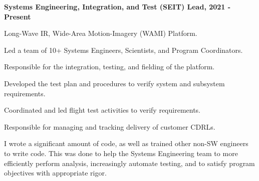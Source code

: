 \documentclass[10pt]{article}
\newenvironment{outerlist}[1][\enskip\textbullet]%
        {\begin{itemize}[#1]}{\end{itemize}%
         \vspace{-.6\baselineskip}}
\newenvironment{innerlist}[1][\enskip\textbullet]%
        {\begin{compactitem}[#1]}{\end{compactitem}}
\begin{document}
     \begin{outerlist}
         \item \textbf{Systems Engineering, Integration, and Test (SEIT) Lead, 2021 - Present}\\
         \begin{innerlist}
            \item Long-Wave IR, Wide-Area Motion-Imagery (WAMI) Platform.
            \item Led a team of 10+ Systems Engineers, Scientists, and Program Coordinators.
            \item Responsible for the integration, testing, and fielding of the platform.
            \begin{innerlist}
                \item Developed the test plan and procedures to verify system and subsystem requirements. 
                \item Coordinated and led flight test activities to verify requirements.
                \item Responsible for managing and tracking delivery of customer CDRLs.
            \end{innerlist}
            \item I wrote a significant amount of code, as well as trained other non-SW engineers to write code.  This was done to help the Systems Engineering 
                  team to more efficiently perform analysis, increasingly automate testing, and to satisfy program objectives with appropriate rigor.\\
         \end{innerlist}
         

\end{outerlist}
\end{document}
